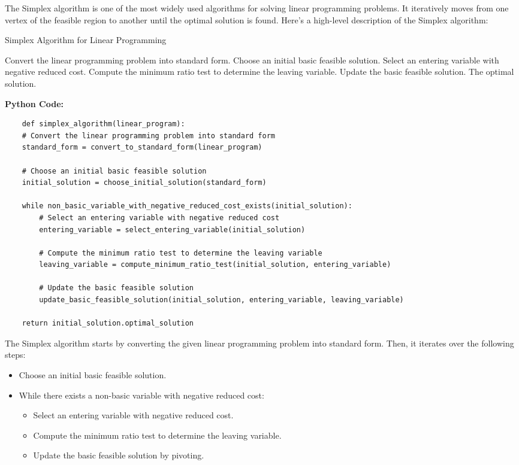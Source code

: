 \documentclass[12pt]{book} %
\begin{document}
The Simplex algorithm is one of the most widely used algorithms for solving linear programming problems. It iteratively moves from one vertex of the feasible region to another until the optimal solution is found. Here's a high-level description of the Simplex algorithm:
\FloatBarrier
\begin{algorithm}
\caption{Simplex Algorithm for Linear Programming}
\begin{algorithmic}[1]
\State Convert the linear programming problem into standard form.
\State Choose an initial basic feasible solution.
    \State Select an entering variable with negative reduced cost.
    \State Compute the minimum ratio test to determine the leaving variable.
    \State Update the basic feasible solution.
\EndWhile
\Return The optimal solution.
\end{algorithmic}
\end{algorithm}
\FloatBarrier
\textbf{Python Code:}
\FloatBarrier
\begin{lstlisting}
    def simplex_algorithm(linear_program):
    # Convert the linear programming problem into standard form
    standard_form = convert_to_standard_form(linear_program)
    
    # Choose an initial basic feasible solution
    initial_solution = choose_initial_solution(standard_form)
    
    while non_basic_variable_with_negative_reduced_cost_exists(initial_solution):
        # Select an entering variable with negative reduced cost
        entering_variable = select_entering_variable(initial_solution)
        
        # Compute the minimum ratio test to determine the leaving variable
        leaving_variable = compute_minimum_ratio_test(initial_solution, entering_variable)
        
        # Update the basic feasible solution
        update_basic_feasible_solution(initial_solution, entering_variable, leaving_variable)
    
    return initial_solution.optimal_solution
\end{lstlisting}
\FloatBarrier
The Simplex algorithm starts by converting the given linear programming problem into standard form. Then, it iterates over the following steps:
\begin{itemize}
\item Choose an initial basic feasible solution.
\item While there exists a non-basic variable with negative reduced cost:
\begin{itemize}
    \item Select an entering variable with negative reduced cost.
    \item Compute the minimum ratio test to determine the leaving variable.
    \item Update the basic feasible solution by pivoting.
\end{itemize}
\end{itemize}
\end{document}
